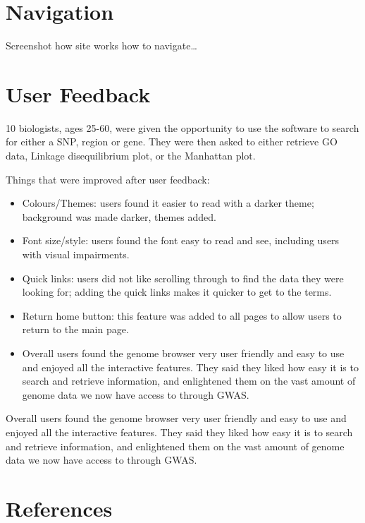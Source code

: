 \documentclass[12pt,a4paper]{article}
\newcommand{\mintfile}[1]{
\begin{tcolorbox}[colback=gray!5!white,%
	grow to left by=20mm,
    grow to right by=20mm,
    sharp corners]{{    \small \inputminted[breaklines]{python}{#1}		}}
\end{tcolorbox}}
\newcommand{\sect}[1]{
\FloatBarrier %
\hypertarget{#1}{
\section{#1}\label{#1}}
}
\begin{document}
\mintfile{code_snippets/SQL/DBreq2.py}

\sect{Navigation}
Screenshot how site works how to navigate\ldots








\sect{User Feedback}
10 biologists, ages 25-60, were given the opportunity to use the software to search for either a SNP, region or gene. They were then asked to either retrieve GO data, Linkage disequilibrium plot, or the Manhattan plot.

Things that were improved after user feedback:

\begin{itemize}
\item Colours/Themes: users found it easier to read with a darker theme; background was made darker, themes added.
\item Font size/style: users found the font easy to read and see, including users with visual impairments.
\item Quick links: users did not like scrolling through to find the data they were looking for; adding the quick links makes it quicker to get to the terms.
\item Return home button: this feature was added to all pages to allow users to return to the main page.
\item Overall users found the genome browser very user friendly and easy to use and enjoyed all the interactive features. They said they liked how easy it is to search and retrieve information, and enlightened them on the vast amount of genome data we now have access to through GWAS.
\end{itemize}

Overall users found the genome browser very user friendly and easy to use and enjoyed all the interactive features. They said they liked how easy it is to search and retrieve information, and enlightened them on the vast amount of genome data we now have access to through GWAS.

\sect{References}
\end{document}
